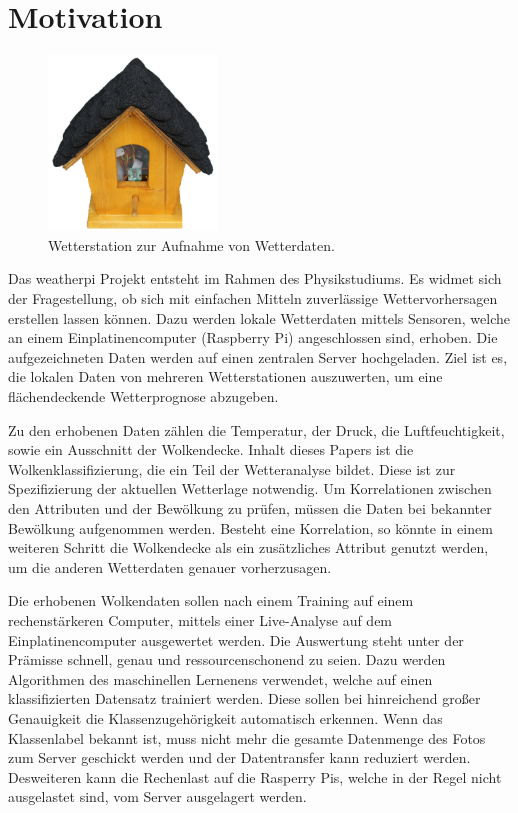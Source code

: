 \section{Motivation}
\label{sec:Motivation}

\begin{figure}
		\vspace{-0.9cm}
		\centering
		\includegraphics[width=0.4\textwidth]{./pictures/wetterstation.pdf}
		\caption{Wetterstation zur Aufnahme von Wetterdaten.}
		\label{fig:name}
		\vspace{-0.5cm}
\end{figure}
Das weatherpi Projekt entsteht im Rahmen des Physikstudiums.
Es widmet sich der Fragestellung, ob sich mit einfachen Mitteln zuverlässige
Wettervorhersagen erstellen lassen können.
Dazu werden lokale Wetterdaten mittels Sensoren, welche an einem 
Einplatinencomputer (Raspberry Pi) angeschlossen sind, erhoben.
Die aufgezeichneten Daten werden auf einen zentralen Server hochgeladen.
Ziel ist es, die lokalen Daten von mehreren Wetterstationen auszuwerten, um eine
flächendeckende Wetterprognose abzugeben. 

Zu den erhobenen Daten zählen die Temperatur, der Druck, die Luftfeuchtigkeit,
sowie ein Ausschnitt der Wolkendecke.
Inhalt dieses Papers ist die Wolkenklassifizierung, die ein Teil der
Wetteranalyse bildet.
Diese ist zur Spezifizierung der aktuellen Wetterlage notwendig.
Um Korrelationen zwischen den Attributen und der Bewölkung zu prüfen,
müssen die Daten bei bekannter Bewölkung aufgenommen werden.
Besteht eine Korrelation, so könnte in einem weiteren Schritt die Wolkendecke
als ein zusätzliches Attribut genutzt werden, um die anderen Wetterdaten genauer
vorherzusagen. 

Die erhobenen Wolkendaten sollen nach einem Training auf einem rechenstärkeren
Computer, mittels einer Live-Analyse auf dem Einplatinencomputer ausgewertet 
werden.
Die Auswertung steht unter der Prämisse schnell, genau und ressourcenschonend 
zu seien.
Dazu werden Algorithmen des maschinellen Lernenens verwendet, welche auf einen
klassifizierten Datensatz trainiert werden. 
Diese sollen bei hinreichend großer Genauigkeit die Klassenzugehörigkeit
automatisch erkennen.
Wenn das Klassenlabel bekannt ist, muss nicht mehr die gesamte Datenmenge des
Fotos zum Server geschickt werden und der Datentransfer kann reduziert werden. 
Desweiteren kann die Rechenlast auf die Rasperry Pis, welche in der Regel 
nicht ausgelastet sind, vom Server ausgelagert werden. 

